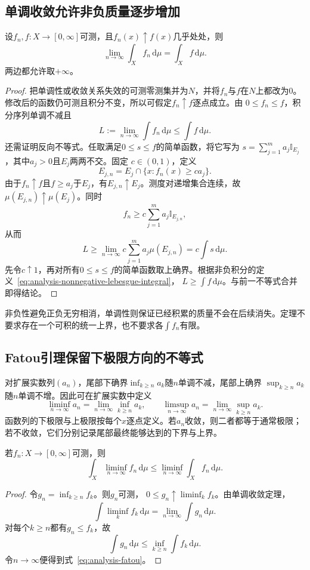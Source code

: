 \subsection{单调收敛允许非负质量逐步增加}
\begin{theorem}[单调收敛定理]
\label{thm:analysis-monotone-convergence}
设$f_n,f:X\to[0,\infty]$可测，且$f_n(x)\uparrow f(x)$几乎处处，则
\[   \lim_{n\to\infty}\int_X f_n\,\mathrm{d}\mu   =   \int_X f\,\mathrm{d}\mu. \]
两边都允许取$+\infty$。
\end{theorem}
\begin{proof}
把单调性或收敛关系失效的可测零测集并为$N$，并将$f_n$与$f$在$N$上都改为$0$。
修改后的函数仍可测且积分不变，所以可假定$f_n\uparrow f$逐点成立。由
$0\leq f_n\leq f$，积分序列单调不减且
\[   L:=\lim_{n\to\infty}\int f_n\,\mathrm{d}\mu   \leq\int f\,\mathrm{d}\mu. \]
还需证明反向不等式。任取满足$0\leq s\leq f$的简单函数，将它写为 $s=\sum_{j=1}^m a_j\mathbb{I}_{E_j}$，其中$a_j>0$且$E_j$两两不交。固定 $c\in(0,1)$，定义
\[   E_{j,n}   =   E_j\cap\{x:f_n(x)\geq ca_j\}. \]
由于$f_n\uparrow f$且$f\geq a_j$于$E_j$，有$E_{j,n}\uparrow E_j$。测度对递增集合连续，故$\mu(E_{j,n})\uparrow\mu(E_j)$。同时
\[   f_n   \geq   c\sum_{j=1}^m a_j\mathbb{I}_{E_{j,n}}, \]
从而
\[   L   \geq   \lim_{n\to\infty}   c\sum_{j=1}^m a_j\mu(E_{j,n})   =   c\int s\,\mathrm{d}\mu. \]
先令$c\uparrow1$，再对所有$0\leq s\leq f$的简单函数取上确界。根据非负积分的定义~\eqref{eq:analysis-nonnegative-lebesgue-integral}， $L\geq\int f\,\mathrm{d}\mu$。与前一不等式合并即得结论。
\end{proof}

非负性避免正负无穷相消，单调性则保证已经积累的质量不会在后续消失。定理不要求存在一个可积的统一上界，也不要求各$\int f_n$有限。
\subsection{Fatou引理保留下极限方向的不等式}
对扩展实数列$(a_n)$，尾部下确界$\inf_{k\geq n}a_k$随$n$单调不减，尾部上确界
$\sup_{k\geq n}a_k$随$n$单调不增。因此可在扩展实数中定义
\[
  \liminf_{n\to\infty}a_n
  =
  \lim_{n\to\infty}\inf_{k\geq n}a_k,
  \qquad
  \limsup_{n\to\infty}a_n
  =
  \lim_{n\to\infty}\sup_{k\geq n}a_k.
\]
函数列的下极限与上极限按每个$x$逐点定义。若$a_n$收敛，则二者都等于通常极限；
若不收敛，它们分别记录尾部最终能够达到的下界与上界。
\begin{lemma}[Fatou引理]
\label{lem:analysis-fatou}
若$f_n:X\to[0,\infty]$可测，则
\begin{equation}
  \int_X\liminf_{n\to\infty}f_n\,\mathrm{d}\mu
  \leq
  \liminf_{n\to\infty}\int_Xf_n\,\mathrm{d}\mu.
\label{eq:analysis-fatou}
\end{equation}
\end{lemma}
\begin{proof}
令$g_n=\inf_{k\geq n}f_k$。则$g_n$可测， $0\leq g_n\uparrow\liminf_k f_k$。由单调收敛定理，
\[   \int\liminf_k f_k\,\mathrm{d}\mu   =   \lim_{n\to\infty}\int g_n\,\mathrm{d}\mu. \]
对每个$k\geq n$都有$g_n\leq f_k$，故
\[   \int g_n\,\mathrm{d}\mu   \leq   \inf_{k\geq n}\int f_k\,\mathrm{d}\mu. \]
令$n\to\infty$便得到式~\eqref{eq:analysis-fatou}。
\end{proof}

